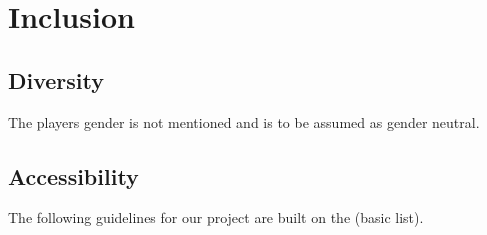 \documentclass[a4paper]{scrreprt}
\begin{document}
\section{Inclusion}

\subsection{Diversity}
The players gender is not mentioned and is to be assumed as gender neutral.

\subsection{Accessibility}

The following guidelines for our project are built on the \cite{accessibilityList} (basic list).
\end{document}
